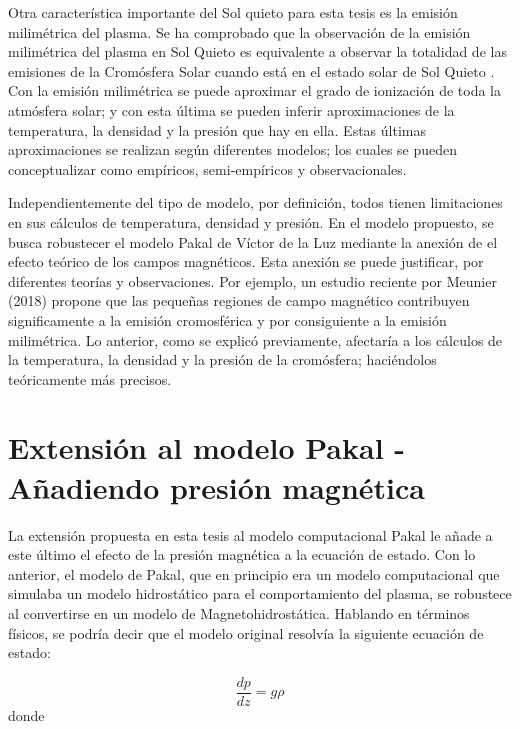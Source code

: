 \documentclass[9pt]{book}
\begin{document}
Otra caracter\'istica importante del Sol quieto para esta tesis es la emisi\'on milim\'etrica del plasma. Se ha comprobado que la observaci\'on de la emisi\'on milim\'etrica del plasma en Sol Quieto es equivalente a observar la totalidad de las emisiones de la Crom\'osfera Solar cuando est\'a en el estado solar de Sol Quieto \cite{millimeter}. Con la emisi\'on milim\'etrica se puede aproximar el grado de ionizaci\'on de toda la atm\'osfera solar; y con esta \'ultima se pueden inferir aproximaciones de la temperatura, la densidad y la presi\'on que hay en ella. Estas \'ultimas aproximaciones se realizan seg\'un diferentes modelos; los cuales se pueden conceptualizar como emp\'iricos, semi-emp\'iricos y observacionales. 

Independientemente del tipo de modelo, por definici\'on, todos tienen limitaciones en sus c\'alculos de temperatura, densidad y presi\'on. En el modelo propuesto, se busca robustecer el modelo Pakal de V\'ictor de la Luz mediante la anexi\'on de el efecto te\'orico de los campos magn\'eticos. Esta anexi\'on se puede justificar, por diferentes teor\'ias y observaciones. Por ejemplo, un estudio reciente por Meunier (2018) propone que las peque\~nas regiones de campo magn\'etico contribuyen significamente a la emisi\'on cromosf\'erica y por consiguiente a la emisi\'on milim\'etrica. Lo anterior, como se explic\'o previamente, afectar\'ia a los c\'alculos de la temperatura, la densidad y la presi\'on de la crom\'osfera; haci\'endolos te\'oricamente m\'as precisos.

\chapter{Extensi\'on al modelo Pakal \-- A\~nadiendo presi\'on magn\'etica}

La extensi\'on propuesta en esta tesis al modelo computacional Pakal le a\~nade a este \'ultimo el efecto de la presi\'on magn\'etica a la ecuaci\'on de estado. Con lo anterior, el modelo de Pakal, que en principio era un modelo computacional que simulaba un modelo hidrost\'atico para el comportamiento del plasma, se robustece al convertirse en un modelo de Magnetohidrost\'atica. Hablando en t\'erminos f\'isicos, se podr\'ia decir que el modelo original resolv\'ia la siguiente ecuaci\'on de estado:

\begin{equation*} \label{ecuacion_hidrostatica}
\frac{dp}{dz} = g\rho
\end{equation*}
donde
\end{document}
